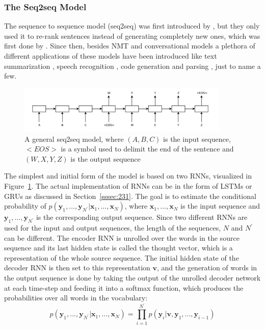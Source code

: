 \documentclass[12pt]{article}
\begin{document}
\subsubsection{The Seq2seq Model} \label{sssec:232}
The sequence to sequence model (seq2seq) was first introduced by \cite{Cho:2014}, but they only used it to re-rank sentences instead of generating completely new ones, which was first done by \cite{Sutskever:2014}. Since then, besides NMT and conversational models a plethora of different applications of these models have been introduced like text summarization \cite{Nallapati:2016}, speech recognition \cite{Chiu:2017}, code generation \cite{Rico:2017} and parsing \cite{Konstas:2017}, just to name a few.

\begin{figure}[H]
	\centering
	\includegraphics[width=0.9\textwidth]{pics/seq2seq.png}
	\caption{A general seq2seq model, where \((A,B,C)\) is the input sequence, \(<EOS>\) is a symbol used to delimit the end of the sentence and \((W,X,Y,Z)\) is the output sequence \cite{Sutskever:2014}}
	\label{fig:232a}
\end{figure}

The simplest and initial form of the model is based on two RNNs, visualized in Figure~\ref{fig:232a}. The actual implementation of RNNs can be in the form of LSTMs or GRUs as discussed in Section~\ref{sssec:231}. The goal is to estimate the conditional probability of \(p(\bm{y}_1,...,\bm{y}_{N^{'}}|\bm{x}_1,...,\bm{x}_N)\), where \(\bm{x}_1,...,\bm{x}_N\) is the input sequence and \(\bm{y}_1,...,\bm{y}_{N^{'}}\) is the corresponding output sequence. Since two different RNNs are used for the input and output sequences, the length of the sequences, \(N\) and \(N^{'}\) can be different. The encoder RNN is unrolled over the words in the source sequence and its last hidden state is called the thought vector, which is a representation of the whole source sequence. The initial hidden state of the decoder RNN is then set to this representation \(\bm{v}\), and the generation of words in the output sequence is done by taking the output of the unrolled decoder network at each time-step and feeding it into a softmax function, which produces the probabilities over all words in the vocabulary:
\begin{equation} \label{eq232a}
p(\bm{y}_1,...,\bm{y}_{N^{'}}|\bm{x}_1,...,\bm{x}_N)=\prod_{i=1}^{N^{'}}p(\bm{y}_i|\bm{v},\bm{y}_1,...,\bm{y}_{i-1})
\end{equation}
\end{document}
